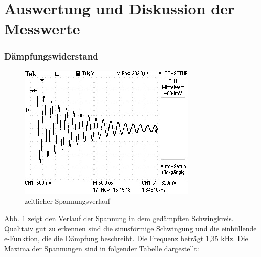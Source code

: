 \section{Auswertung und Diskussion der Messwerte}
\label{sec:Auswertung}

\subsubsection{Dämpfungswiderstand}
\begin{figure}
  \centering
  \includegraphics{data/F0000TEK.jpg}
  \caption{zeitlicher Spannungsverlauf}
  \label{fig:5aergebnis}
\end{figure}
Abb. \ref{fig:5aergebnis} zeigt den Verlauf der Spannung in dem gedämpften
Schwingkreis. Qualitaiv gut zu erkennen sind die sinusförmige Schwingung und
die einhüllende e-Funktion, die die Dämpfung beschreibt.
Die Frequenz beträgt 1,35 kHz.
Die Maxima der Spannungen sind in folgender Tabelle dargestellt:
